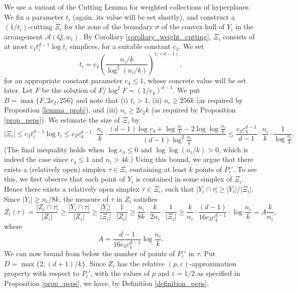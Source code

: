 \documentclass[11pt]{article}
\def\peps{(p,\varepsilon)}
\def\eps{\varepsilon}
\begin{document}
We use a variant of the Cutting Lemma for weighted collections of hyperplanes. We fix a parameter $t_{i}$ (again, its value will be set shortly), and construct a $(1/t_{i})$-cutting $\Xi_{i}$ for the zone of the boundary $\sigma$ of the convex hull of $Y_{i}$ in the arrangement $\mathcal{A}(Q,w_{i})$. By Corollary \ref{corollary_weight_cutting}, $\Xi_{i}$ consists of at most $c_{3}t_{i}^{d-1} \log t_{i}$ simplices, for a suitable constant $c_{3}$. We set
$$
t_{i} = c_{4}\left(\frac{n_{i}/k}{\log^{2}(n_{i}/k)}\right)^{1/(d-1)},
$$
for an appropriate constant parameter $c_{4} \leq 1$, whose concrete value will be set later. Let $F$ be the solution of $F/\log^{2} F = (1/c_{4})^{d-1}$. We put $B = \max\{F, 2c_{2}, 256\}$ and note that (i) $t_{i} > 1$, (ii) $n_{i} \geq 256 k$ (as required by Proposition \ref{lemma_prob}), and (iii) $n_{i} \geq 2 c_{2} k$ (as required by Proposition \ref{prop_peps}). We estimate the size of $\Xi_{i}$ by
$$
|\Xi_{i}| \leq c_{3}t_{i}^{d-1}\log t_{i} \leq
c_{3}c_{4}^{d-1} \cdot \frac{n_{i}}{k} \cdot \frac{(d-1)\log c_{4} + \log\frac{n_{i}}{k} - 2 \log \log \frac{n_{i}}{k}}{(d-1) \log^{2}\frac{n_{i}}{k}} \leq  \frac{c_{3}c_{4}^{d-1}}{d-1}\cdot \frac{n_{i}}{k} \cdot \frac{1}{\log \frac{n_{i}}{k}}.
$$
(The final inequality holds when $\log c_{4} \leq 0$ and $\log \log (n_{i}/k) > 0$, which is indeed the case since $c_{4} \leq 1$ and $n_{i} > 4k$.) Using this bound, we argue that there exists a (relatively open) simplex $\tau \in \Xi_{i}$ containing at least $k$ points of $P_{i}'$. To see this, we first observe that each point of $Y_{i}$ is contained in some simplex of $\Xi_{i}$. Hence there exists a relatively open simplex $\tau \in \Xi_{i}$, such that $|Y_{i} \cap \tau| \geq |Y_{i}|/|\Xi_{i}|$. Since $|Y_{i}| \geq n_{i}/8k$, the measure of $\tau$ in $Z_{i}$ satisfies
$$
\overline{Z_{i}}(\tau) = \frac{|Z_{i} \cap \tau|}{|Z_{i}|} \geq \frac{|Y_{i} \cap \tau|}{|Z_{i}|} \geq {\frac{|Y_{i}|}{|\Xi_{i}|}} \cdot \frac{1}{|Z_{i}|} \geq
\frac{n_{i}}{8k} \cdot \frac{k}{2n_{i}} \cdot \frac{1}{|\Xi_{i}|} \geq
\frac{k}{n_{i}} \cdot \frac{(d-1)}{16 c_{3}c_{4}^{d-1}} \cdot \log \frac{n_{i}}{k} = A \frac{k}{n_{i}},
$$
where
\begin{equation} \label{eq_Z_measure}
A = \frac{d-1}{16 c_{3}c_{4}^{d-1}} \log \frac{n_{i}}{k}.
\end{equation}
We can now bound from below the number of points of $P_{i}'$ in $\tau$. Put $D = \max\{2,(d+1)/k\}$. Since $Z_{i}$ has the relative $\peps$-approximation property with respect to $P_{i}'$, with the values of $p$ and $\eps = 1/2$ as specified in Proposition \ref{prop_peps}, we have, by Definition \ref{definition_peps},
\end{document}
